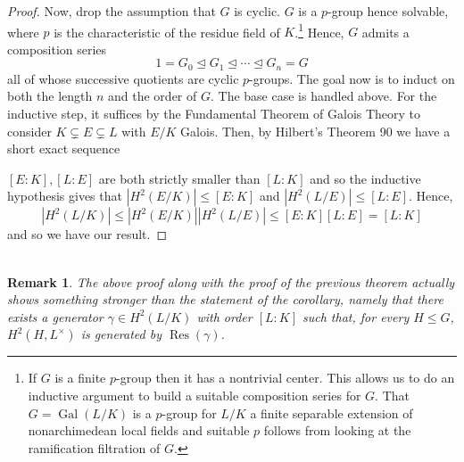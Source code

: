 \documentclass[11pt]{article}
\newcommand{\normal}{\trianglelefteq}
\DeclareMathOperator{\Gal}{Gal}
\DeclareMathOperator{\Inf}{Inf} %
\DeclareMathOperator{\Res}{Res} %
\newtheorem*{remark*}{\\Remark}
\begin{document}
\begin{proof}
Now, drop the assumption that $G$ is cyclic. $G$ is a $p$-group hence solvable, where $p$ is the characteristic of the residue field of $K$.\footnote{If $G$ is a finite $p$-group then it has a nontrivial center. This allows us to do an inductive argument to build a suitable composition series for $G$. That $G=\Gal(L/K)$ is a $p$-group for $L/K$ a finite separable extension of nonarchimedean local fields and suitable $p$ follows from looking at the ramification filtration of $G$.} Hence, $G$ admits a composition series
$$1=G_0\normal G_1\normal\cdots\normal G_n=G$$
all of whose successive quotients are cyclic $p$-groups. The goal now is to induct on both the length $n$ and the order of $G$. The base case is handled above. For the inductive step, it suffices by the Fundamental Theorem of Galois Theory to consider $K\subsetneq E\subsetneq L$ with $E/K$ Galois. Then, by Hilbert's Theorem 90 we have a short exact sequence 
\begin{center}
\end{center}
$[E:K],[L:E]$ are both strictly smaller than $[L:K]$ and so the inductive hypothesis gives that $|H^2(E/K)|\leq[E:K]$ and $|H^2(L/E)|\leq[L:E]$. Hence,
$$|H^2(L/K)|\leq|H^2(E/K)||H^2(L/E)|\leq[E:K][L:E]=[L:K]$$
and so we have our result.
\end{proof}

\begin{remark*}
The above proof along with the proof of the previous theorem actually shows something stronger than the statement of the corollary, namely that there exists a generator $\gamma\in H^2(L/K)$ with order $[L:K]$ such that, for every $H\leq G$, $H^2(H,L^{\times})$ is generated by $\Res(\gamma)$.
\end{remark*}
\end{document}
